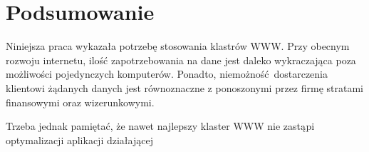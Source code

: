 \chapter*{Podsumowanie}
Niniejsza praca wykazała potrzebę stosowania klastrów WWW.
Przy obecnym rozwoju internetu, ilość zapotrzebowania na dane jest daleko wykraczająca poza możliwości pojedynczych komputerów.
Ponadto, niemożność dostarczenia klientowi żądanych danych jest równoznaczne z ponoszonymi przez firmę stratami finansowymi oraz wizerunkowymi.

Trzeba jednak pamiętać, że nawet najlepszy klaster WWW nie zastąpi optymalizacji aplikacji działającej 
